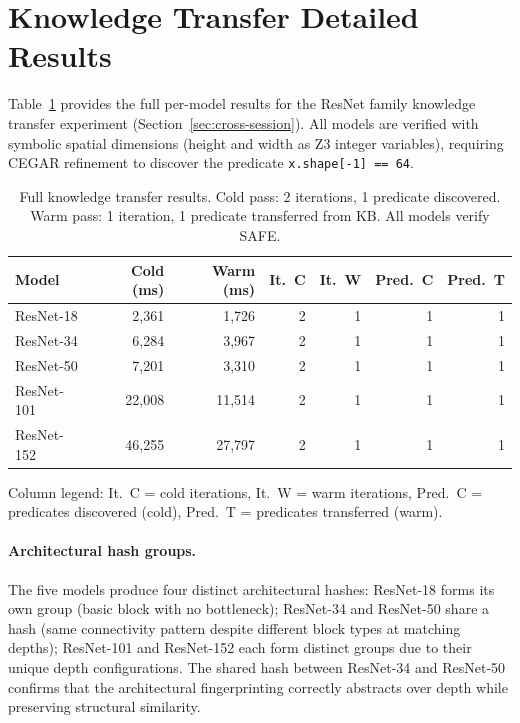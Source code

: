 \documentclass[11pt]{article}
\begin{document}
\section{Knowledge Transfer Detailed Results}\label{app:kt-details}

Table~\ref{tab:kt-full} provides the full per-model results for the
ResNet family knowledge transfer experiment
(Section~\ref{sec:cross-session}).  All models are verified with
symbolic spatial dimensions (height and width as Z3 integer variables),
requiring CEGAR refinement to discover the predicate
\texttt{x.shape[-1] == 64}.

\begin{table}[h]
\centering
\caption{Full knowledge transfer results.  Cold pass: 2 iterations,
  1 predicate discovered.  Warm pass: 1 iteration, 1 predicate
  transferred from KB.  All models verify SAFE.}
\label{tab:kt-full}
\small
\begin{tabular}{@{}lrrrrrr@{}}
\toprule
\textbf{Model} & \textbf{Cold (ms)} & \textbf{Warm (ms)} &
\textbf{It.\ C} & \textbf{It.\ W} & \textbf{Pred.\ C} &
\textbf{Pred.\ T} \\
\midrule
ResNet-18  & 2,361  & 1,726  & 2 & 1 & 1 & 1 \\
ResNet-34  & 6,284  & 3,967  & 2 & 1 & 1 & 1 \\
ResNet-50  & 7,201  & 3,310  & 2 & 1 & 1 & 1 \\
ResNet-101 & 22,008 & 11,514 & 2 & 1 & 1 & 1 \\
ResNet-152 & 46,255 & 27,797 & 2 & 1 & 1 & 1 \\
\bottomrule
\end{tabular}
\end{table}

Column legend: It.\ C = cold iterations, It.\ W = warm iterations,
Pred.\ C = predicates discovered (cold), Pred.\ T = predicates
transferred (warm).

\paragraph{Architectural hash groups.}
The five models produce four distinct architectural hashes:
ResNet-18 forms its own group (basic block with no bottleneck);
ResNet-34 and ResNet-50 share a hash (same connectivity pattern
despite different block types at matching depths);
ResNet-101 and ResNet-152 each form distinct groups due to their
unique depth configurations.  The shared hash between ResNet-34 and
ResNet-50 confirms that the architectural fingerprinting correctly
abstracts over depth while preserving structural similarity.
\end{document}
